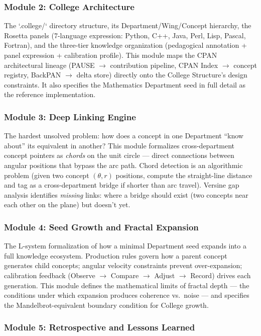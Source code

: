 \documentclass[11pt,letterpaper]{article}
\begin{document}
\subsubsection{Module 2: College Architecture}

The `.college/` directory structure, its Department/Wing/Concept hierarchy, the Rosetta panels
(7-language expression: Python, C++, Java, Perl, Lisp, Pascal, Fortran), and the three-tier
knowledge organization (pedagogical annotation + panel expression + calibration profile). This
module maps the CPAN architectural lineage (PAUSE $\to$ contribution pipeline, CPAN Index $\to$
concept registry, BackPAN $\to$ delta store) directly onto the College Structure's design
constraints. It also specifies the Mathematics Department seed in full detail as the reference
implementation.

\subsubsection{Module 3: Deep Linking Engine}

The hardest unsolved problem: how does a concept in one Department ``know about'' its equivalent
in another? This module formalizes cross-department concept pointers as \textit{chords} on the
unit circle --- direct connections between angular positions that bypass the arc path. Chord
detection is an algorithmic problem (given two concept $(θ, r)$ positions, compute the straight-line
distance and tag as a cross-department bridge if shorter than arc travel). Versine gap analysis
identifies \textit{missing} links: where a bridge should exist (two concepts near each other
on the plane) but doesn't yet.

\subsubsection{Module 4: Seed Growth and Fractal Expansion}

The L-system formalization of how a minimal Department seed expands into a full knowledge
ecosystem. Production rules govern how a parent concept generates child concepts; angular velocity
constraints prevent over-expansion; calibration feedback (Observe $\to$ Compare $\to$ Adjust $\to$
Record) drives each generation. This module defines the mathematical limits of fractal depth ---
the conditions under which expansion produces coherence vs.\ noise --- and specifies the
Mandelbrot-equivalent boundary condition for College growth.

\subsubsection{Module 5: Retrospective and Lessons Learned}
\end{document}
